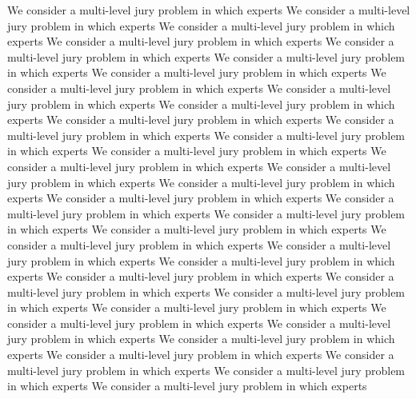 \documentclass[letterpaper]{article}
\begin{document}
\normalsize

We consider a multi-level jury problem in which experts
We consider a multi-level jury problem in which experts
We consider a multi-level jury problem in which experts
We consider a multi-level jury problem in which experts
We consider a multi-level jury problem in which experts
We consider a multi-level jury problem in which experts
We consider a multi-level jury problem in which experts
We consider a multi-level jury problem in which experts
We consider a multi-level jury problem in which experts
We consider a multi-level jury problem in which experts
We consider a multi-level jury problem in which experts
We consider a multi-level jury problem in which experts
We consider a multi-level jury problem in which experts
We consider a multi-level jury problem in which experts
We consider a multi-level jury problem in which experts
We consider a multi-level jury problem in which experts
We consider a multi-level jury problem in which experts
We consider a multi-level jury problem in which experts
We consider a multi-level jury problem in which experts
We consider a multi-level jury problem in which experts
We consider a multi-level jury problem in which experts
We consider a multi-level jury problem in which experts
We consider a multi-level jury problem in which experts
We consider a multi-level jury problem in which experts
We consider a multi-level jury problem in which experts
We consider a multi-level jury problem in which experts
We consider a multi-level jury problem in which experts
We consider a multi-level jury problem in which experts
We consider a multi-level jury problem in which experts
We consider a multi-level jury problem in which experts
We consider a multi-level jury problem in which experts
We consider a multi-level jury problem in which experts
We consider a multi-level jury problem in which experts
We consider a multi-level jury problem in which experts
We consider a multi-level jury problem in which experts
\clearpage

\end{document}
